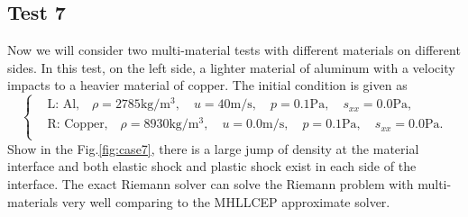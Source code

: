 \documentclass[review]{elsarticle}
\begin{document}
\subsection{Test 7}
Now we will consider two multi-material tests with different materials on different sides. In this test, on the left side, a lighter material of aluminum with a velocity impacts to a heavier material of copper. The initial condition is given as
\begin{equation}
 \left\{ \begin{aligned}
	 &	 \text{L: Al,}\quad  \rho = 2785 \text{kg}/\text{m}^3, \quad  u = 40\text{m}/\text{s}, \quad  p = 0.1\text{Pa}, \quad  s_{xx}=0.0\text{Pa},\\
	 &	 \text{R: Copper,}\quad  \rho = 8930\text{kg}/\text{m}^3, \quad  u = 0.0\text{m}/\text{s}, \quad  p =0.1\text{Pa}, \quad  s_{xx}=0.0\text{Pa}.\\
   \end{aligned}
 \right.
\end{equation}
Show in the Fig.\ref{fig:case7}, there is a large jump of density at the material interface and  both elastic shock and plastic shock exist in each side of the interface. The exact Riemann solver can solve the Riemann problem with multi-materials very well comparing to the MHLLCEP approximate solver.
\end{document}
